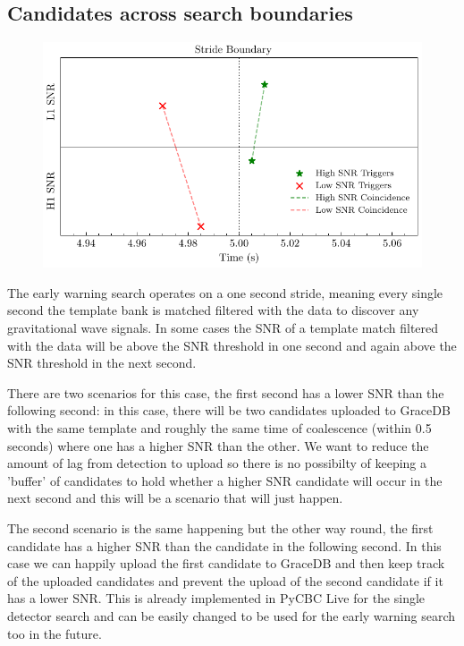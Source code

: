 \subsection{Candidates across search boundaries}
%
\begin{figure}
       \centering
    \includegraphics[width=\textwidth]{images/6_earlywarning/identified-problems/cands_across_bounds.pdf}
    \caption{}
    \label{6:fig:candidates_across_boundaries}
\end{figure}
%
The early warning search operates on a one second stride, meaning every single second the template bank is matched filtered with the data to discover any gravitational wave signals. In some cases the SNR of a template match filtered with the data will be above the SNR threshold in one second and again above the SNR threshold in the next second.

There are two scenarios for this case, the first second has a lower SNR than the following second: in this case, there will be two candidates uploaded to GraceDB with the same template and roughly the same time of coalescence (within 0.5 seconds) where one has a higher SNR than the other. We want to reduce the amount of lag from detection to upload so there is no possibilty of keeping a 'buffer' of candidates to hold whether a higher SNR candidate will occur in the next second and this will be a scenario that will just happen.

The second scenario is the same happening but the other way round, the first candidate has a higher SNR than the candidate in the following second. In this case we can happily upload the first candidate to GraceDB and then keep track of the uploaded candidates and prevent the upload of the second candidate if it has a lower SNR. This is already implemented in PyCBC Live for the single detector search and can be easily changed to be used for the early warning search too in the future.

